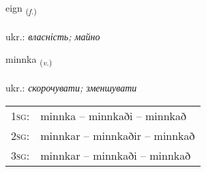\documentclass[frontgrid, backgrid]{flacards}\usepackage[]{graphicx}\usepackage[]{xcolor}
\begin{document}
\renewcommand{\flhead}{\vskip5pt \fboxsep=0pt {\small\bfseries\footnotesize Nafnorð | іменник}}
\renewcommand{\fcfoot}{\vskip5pt \fboxsep=0pt \hspace{2pt}{\small\bfseries\footnotesize 1K}}

\renewcommand{\blhead}{\vskip5pt {\small\bfseries\footnotesize Nafnorð | іменник }}
\renewcommand{\bcfoot}{\vskip5pt \hspace{2pt}{\small\bfseries\footnotesize 1K}}


{eign \small{\textsubscript{(\textit{f.})}} \\[1ex] %
\textphonetic{[eikn̥]} \\
ukr.: \emph{власність; майно} \\  [2ex]
\renewcommand*{\arraystretch}{0.8}
}

\renewcommand{\flhead}{\vskip5pt \fboxsep=0pt {\small\bfseries\footnotesize Sagnorð | дієслово}}
\renewcommand{\fcfoot}{\vskip5pt \fboxsep=0pt \hspace{2pt}{\small\bfseries\footnotesize 1K}}

\renewcommand{\blhead}{\vskip5pt {\small\bfseries\footnotesize Sagnorð | дієслово }}
\renewcommand{\bcfoot}{\vskip5pt \hspace{2pt}{\small\bfseries\footnotesize 1K}}


{minnka \small{\textsubscript{(\textit{v.})}} \\[1ex] %
\textphonetic{[miŋ̥ka]} \\
ukr.: \emph{скорочувати; зменшувати} \\  [2ex]
\renewcommand*{\arraystretch}{0.8}
\begin{tabular}{p{1cm}l}
\textsc{1sg}: & minnka -- minnkaði -- minnkað \\ 
\textsc{2sg}: & minnkar -- minnkaðir -- minnkað \\ 
\textsc{3sg}: & minnkar -- minnkaði -- minnkað \\ 
\end{tabular}
}
\end{document}
